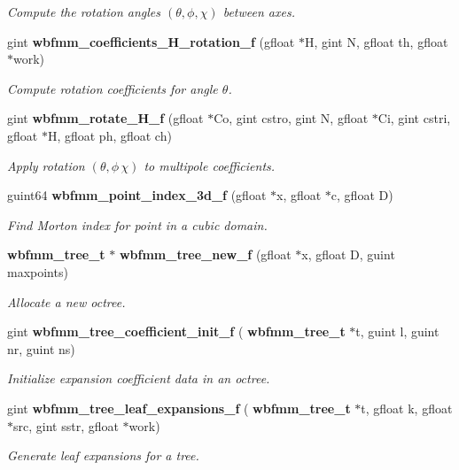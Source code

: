 \begin{DoxyCompactItemize}
\begin{DoxyCompactList}\small\item\em Compute the rotation angles $(\theta,\phi,\chi)$ between axes. \end{DoxyCompactList}\item 
gint \textbf{ wbfmm\+\_\+coefficients\+\_\+\+H\+\_\+rotation\+\_\+f} (gfloat $\ast$H, gint N, gfloat th, gfloat $\ast$work)
\begin{DoxyCompactList}\small\item\em Compute rotation coefficients for angle $\theta$. \end{DoxyCompactList}\item 
gint \textbf{ wbfmm\+\_\+rotate\+\_\+\+H\+\_\+f} (gfloat $\ast$Co, gint cstro, gint N, gfloat $\ast$Ci, gint cstri, gfloat $\ast$H, gfloat ph, gfloat ch)
\begin{DoxyCompactList}\small\item\em Apply rotation $(\theta,\phi\,\chi)$ to multipole coefficients. \end{DoxyCompactList}\item 
guint64 \textbf{ wbfmm\+\_\+point\+\_\+index\+\_\+3d\+\_\+f} (gfloat $\ast$x, gfloat $\ast$c, gfloat D)
\begin{DoxyCompactList}\small\item\em Find Morton index for point in a cubic domain. \end{DoxyCompactList}\item 
\textbf{ wbfmm\+\_\+tree\+\_\+t} $\ast$ \textbf{ wbfmm\+\_\+tree\+\_\+new\+\_\+f} (gfloat $\ast$x, gfloat D, guint maxpoints)
\begin{DoxyCompactList}\small\item\em Allocate a new octree. \end{DoxyCompactList}\item 
gint \textbf{ wbfmm\+\_\+tree\+\_\+coefficient\+\_\+init\+\_\+f} (\textbf{ wbfmm\+\_\+tree\+\_\+t} $\ast$t, guint l, guint nr, guint ns)
\begin{DoxyCompactList}\small\item\em Initialize expansion coefficient data in an octree. \end{DoxyCompactList}\item 
gint \textbf{ wbfmm\+\_\+tree\+\_\+leaf\+\_\+expansions\+\_\+f} (\textbf{ wbfmm\+\_\+tree\+\_\+t} $\ast$t, gfloat k, gfloat $\ast$src, gint sstr, gfloat $\ast$work)
\begin{DoxyCompactList}\small\item\em Generate leaf expansions for a tree. \end{DoxyCompactList}\item 

\end{DoxyCompactItemize}
